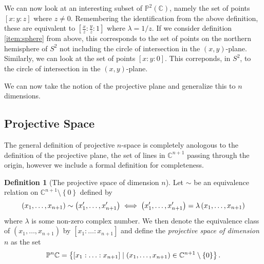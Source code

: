 \documentclass[a4paper]{article}
\theoremstyle{definition}
\newtheorem{defn}{Definition}
\theoremstyle{plain}
\newcommand{\C}{\ensuremath{\mathbb{C}}}
\newcommand{\proj}{\ensuremath{\mathbb{P}}}
\begin{document}
    We can now look at an interesting subset of $\proj^2(\C)$, namely the set
    of points $\left[x : y : z \right]$ where $z \neq 0$. Remembering the
    identification from the above definition, these are equivalent to $\left[
    \frac{x}{z} : \frac{y}{z} : 1 \right]$ where $\lambda = 1 / z$. If we
    consider definition \cref{item:sphere} from above, this corresponds to the
    set of points on the northern hemisphere of $S^2$ not including the circle
    of intersection in the $(x, y)$-plane. Similarly, we can look at the set of
    points $\left[ x : y : 0 \right]$. This correponds, in $S^2$, to the circle
    of intersection in the $(x, y)$-plane.

    We can now take the notion of the
    projective plane and generalize this to $n$ dimensions.
    
    \subsection{Projective Space}
    \label{sub:projective_space}
    
    The general definition of projective $n$-space is completely anologous to
    the definition of the projective plane, the set of lines in $\C^{n+1}$
    passing through the origin, however we include a formal definition for
    completeness.

    \begin{defn}[The projective space of dimension $n$]
        Let $\sim$ be an equivalence relation on $\C^{n+1} \setminus \left\{ 0
        \right\}$ defined by
        \begin{equation}
            \notag
            \left( x_1, \ldots, x_{n+1} \right) \sim \left( x_1', \ldots,
            x_{n+1}' \right) \iff \left( x_1', \ldots, x_{n+1}' \right) =
            \lambda \left( x_1, \ldots, x_{n+1} \right)
        \end{equation}
        where $\lambda$ is some non-zero complex number. We then denote the
        equivalence class of $\left( x_1, \ldots, x_{n+1} \right)$ by $\left[
        x_1 : \ldots : x_{n+1} \right]$ and define the \emph{projective space
        of dimension $n$} as the set
        \begin{equation}
            \notag
            \proj^n{\C} = \left\{ \left[ x_1 : \ldots : x_{n+1} \right] \mid
            \left( x_1, \ldots, x_{n+1} \right) \in \C^{n+1} \setminus \left\{
            0 \right\} \right\}.
        \end{equation}
    \end{defn}
    
\end{document}
